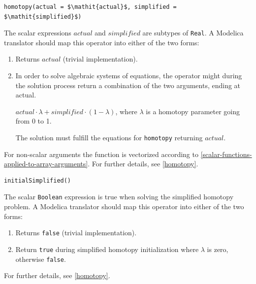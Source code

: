 \begin{operatordefinition}[homotopy]
\begin{synopsis}\begin{lstlisting}
homotopy(actual = $\mathit{actual}$, simplified = $\mathit{simplified}$)
\end{lstlisting}\end{synopsis}
\begin{semantics}
The scalar expressions $\mathit{actual}$ and $\mathit{simplified}$ are subtypes of \lstinline!Real!.
A Modelica translator should map this operator into either of the two forms:
\begin{enumerate}
\item
  Returns $\mathit{actual}$ (trivial implementation).
\item
  In order to solve algebraic systems of equations, the operator might during the solution process return a combination of the two arguments, ending at actual.
  \begin{example}
  $\mathit{actual} \cdot \lambda + \mathit{simplified} \cdot (1 - \lambda)$, where $\lambda$ is a homotopy parameter going from 0 to 1.
  \end{example}
  The solution must fulfill the equations for \lstinline!homotopy! returning $\mathit{actual}$.
\end{enumerate}
For non-scalar arguments the function is vectorized according to \cref{scalar-functions-applied-to-array-arguments}.
For further details, see \cref{homotopy}.
\end{semantics}
\end{operatordefinition}

\begin{operatordefinition}[initialSimplified]
\begin{synopsis}\begin{lstlisting}
initialSimplified()
\end{lstlisting}\end{synopsis}
\begin{semantics}
The scalar \lstinline!Boolean! expression is true when solving the simplified homotopy problem.
A Modelica translator should map this operator into either of the two forms:
\begin{enumerate}
\item
  Returns \lstinline!false! (trivial implementation).
\item
  Return \lstinline!true! during simplified homotopy initialization where $\lambda$ is zero, otherwise \lstinline!false!.
\end{enumerate}
For further details, see \cref{homotopy}.
\end{semantics}
\end{operatordefinition}


